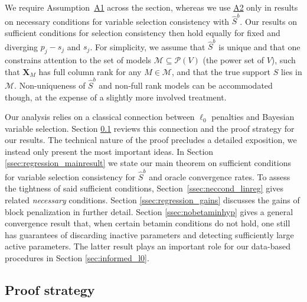 \documentclass[bj,authoryear]{imsart}
\theoremstyle{plain}
\newcommand{\paul}[1]{{\small{\color{green} \sf $\spadesuit$ Paul: #1}}}
\newcommand{\M}{\mathcal{M}}
\newcommand{\bs}{\boldsymbol}
\begin{document}
We require Assumption~\hyperlink{lab:A1}{A1} across the section, whereas we use \hyperlink{lab:A2}{A2} only in results on necessary conditions for variable selection consistency with $\hat S^b$. Our results on sufficient conditions for selection consistency then hold equally for fixed and diverging $p_j-s_j$ and $s_j$. For simplicity, we assume that $\hat{S}^b$ is unique and that one constrains attention to the set of models $\M\subseteq \mathcal P(V)$ (the power set of $V$),
such that
$\bs X_M$ has full column rank for any $M \in \M$, and that the true support $S$ lies in $\M$. Non-uniqueness of $\hat{S}^b$ and non-full rank models can be accommodated though, at the expense of a slightly more involved treatment.

Our analysis relies on a classical connection
between $\ell_0$ penalties and Bayesian variable selection. 
Section \ref{ssec:regression_proof_strategy} reviews this connection and the proof strategy for our results.
The technical nature of the proof precludes a detailed exposition, we instead only present the most important ideas.
In Section \ref{ssec:regression_mainresult} we state our main theorem
on sufficient conditions for variable selection consistency for $\hat{S}^{b}$ and oracle convergence rates. %
To assess the tightness of said sufficient conditions, Section~\ref{ssec:neccond_linreg} gives related {\it necessary} conditions.  %
Section \ref{ssec:regression_gains} discusses the gains of block penalization in further detail. Section \ref{ssec:nobetaminhyp} gives a general convergence result that, when certain betamin conditions do not hold, one still has guarantees of discarding inactive parameters and detecting sufficiently large active parameters.
The latter result plays an important role for our data-based procedures in Section \ref{sec:informed_l0}. 


\subsection{Proof strategy}
\label{ssec:regression_proof_strategy}
\end{document}
